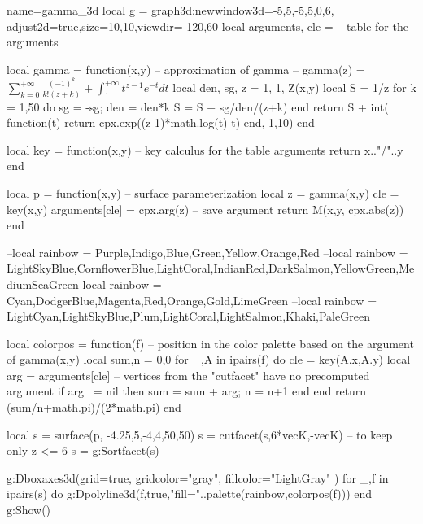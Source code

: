 \documentclass[10pt]{standalone}%
\begin{document}
\begin{luadraw}{name=gamma_3d}
local g = graph3d:new{window3d={-5,5,-5,5,0,6}, adjust2d=true,size={10,10},viewdir={-120,60}}
local arguments, cle = {} -- table for the arguments

local gamma = function(x,y) -- approximation of gamma
-- gamma(z) = $\sum_{k=0}^{+\infty} \frac{(-1)^k}{k!(z+k)} + \int_1^{+\infty} t^{z-1}e^{-t}dt$
    local den, sg, z = 1, 1, Z(x,y)
    local S = 1/z
    for k = 1,50 do
        sg = -sg; den = den*k
        S = S + sg/den/(z+k)
    end
    return S + int( function(t) return cpx.exp((z-1)*math.log(t)-t) end, 1,10)
end

local key = function(x,y) -- key calculus for the table arguments
    return x.."/"..y
end

local  p = function(x,y) -- surface parameterization
    local z = gamma(x,y)
    cle = key(x,y)
    arguments[cle] = cpx.arg(z) -- save argument
    return M(x,y, cpx.abs(z))
end

--local rainbow = {Purple,Indigo,Blue,Green,Yellow,Orange,Red}
--local rainbow = {LightSkyBlue,CornflowerBlue,LightCoral,IndianRed,DarkSalmon,YellowGreen,MediumSeaGreen}
local rainbow = {Cyan,DodgerBlue,Magenta,Red,Orange,Gold,LimeGreen}
--local rainbow = {LightCyan,LightSkyBlue,Plum,LightCoral,LightSalmon,Khaki,PaleGreen}

local colorpos = function(f)  -- position in the color palette based on the argument of gamma(x,y)
    local sum,n = 0,0
    for _,A in ipairs(f) do
        cle = key(A.x,A.y)
        local arg = arguments[cle] -- vertices from the "cutfacet" have no precomputed argument
        if arg ~= nil then sum = sum + arg; n = n+1 
        end 
    end
    return (sum/n+math.pi)/(2*math.pi)
end

local s = surface(p, -4.25,5,-4,4,{50,50})
s = cutfacet(s,{6*vecK,-vecK})  -- to keep only z <= 6
s = g:Sortfacet(s)
   
g:Dboxaxes3d({grid=true, gridcolor="gray", fillcolor="LightGray" })
for _,f in ipairs(s) do
    g:Dpolyline3d(f,true,"fill="..palette(rainbow,colorpos(f)))
end
g:Show()
\end{luadraw}
\end{document}
